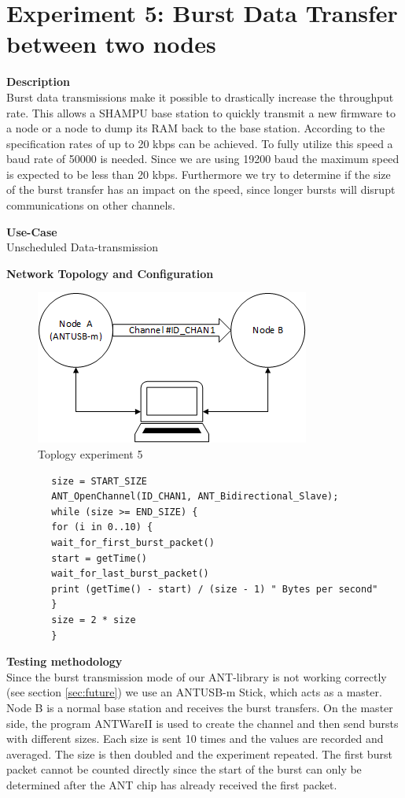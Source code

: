 \section{Experiment 5: Burst Data Transfer between two nodes}
\begin{description} 
	\item{\textbf{Description}} \hfill \\ Burst data transmissions make it possible to drastically increase the throughput rate. This allows a SHAMPU base station to quickly transmit a new firmware to a node or a node to dump its RAM back to the base station.	According to the  specification rates of up to 20 kbps can be achieved. To fully utilize this speed a baud rate of 50000 is needed. Since we are using 19200 baud the maximum speed is expected to be less than 20 kbps. Furthermore we try to determine if the size of the burst transfer has an impact on the speed, since longer bursts will disrupt communications on other channels.
	\item{\textbf{Use-Case}} \hfill \\ Unscheduled Data-transmission
	\item{\textbf{Network Topology and Configuration}} \hfill \\ 
	\begin{figure}[h]
		\centering
		\includegraphics[scale=1]{content/images/exp5_topo.png}
		\caption{Toplogy experiment 5}
	\end{figure}
	\begin{code}[h]
		\begin{verbatim}
		size = START_SIZE
		ANT_OpenChannel(ID_CHAN1, ANT_Bidirectional_Slave);		
		while (size >= END_SIZE) {
		for (i in 0..10) {
		wait_for_first_burst_packet()
		start = getTime()
		wait_for_last_burst_packet()
		print (getTime() - start) / (size - 1) " Bytes per second"
		}
		size = 2 * size
		}
		\end{verbatim}
		\caption{Burst data transfer (Slave)}\label{lst:sExp5}
	\end{code}
	\item{\textbf{Testing methodology}} \hfill \\ Since the burst transmission mode of our ANT-library is not working correctly (see section \ref{sec:future}) we use an ANTUSB-m Stick, which acts as a master. Node B is a normal base station and receives the burst transfers. On the master side, the program ANTWareII \cite{ANTwareII} is used to create the channel and then send bursts with different sizes. Each size is sent 10 times and the values are recorded and averaged. The size is then doubled and the experiment repeated. The first burst packet cannot be counted directly since the start of the burst can only be determined after the ANT chip has already received the first packet.

\end{description}
